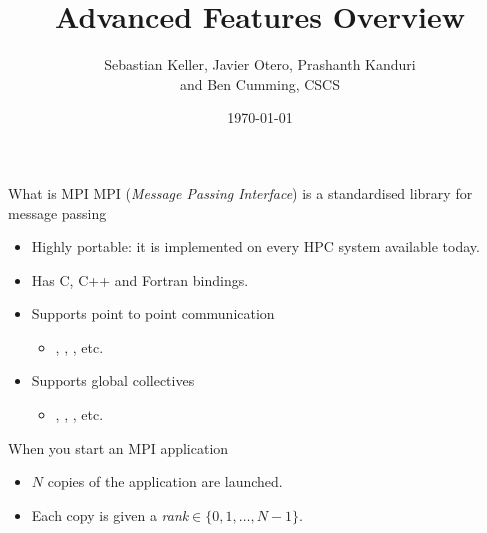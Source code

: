 \documentclass[aspectratio=43]{beamer}
\author{Sebastian Keller, Javier Otero, Prashanth Kanduri\\ and Ben Cumming, CSCS}
\title{Advanced Features Overview}
\subtitle{}
\date{\today}
\begin{document}
\cscstitle


\begin{frame}[fragile]{What is MPI}
    MPI (\emph{Message Passing Interface}) is a standardised library for message passing
    \begin{itemize}
        \item Highly portable: it is implemented on every HPC system available today.
        \item Has C, C++ and Fortran bindings.
        \item Supports point to point communication
        \begin{itemize}
            \item {}, , , etc.
        \end{itemize}
        \item Supports global collectives
        \begin{itemize}
            \item {}, , , etc.
        \end{itemize}
    \end{itemize}
    When you start an MPI application
    \begin{itemize}
        \item $N$ copies of the application are launched.
        \item Each copy is given a \emph{rank}$\in\{0,1,\dots,N-1\}$.
    \end{itemize}
\end{frame}
\end{document}
